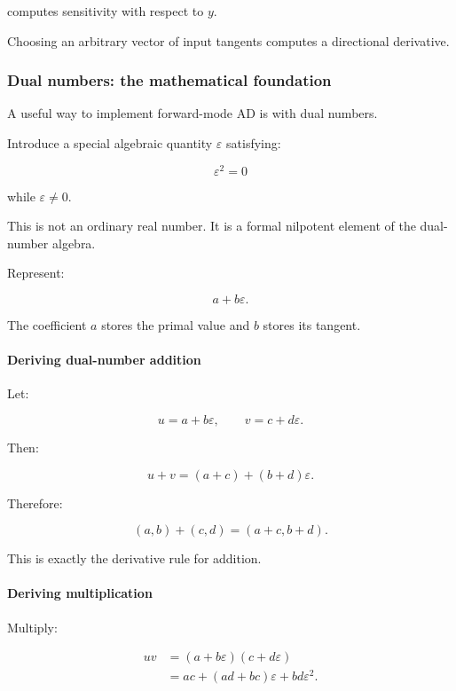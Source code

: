 computes sensitivity with respect to \(y\).

Choosing an arbitrary vector of input tangents computes a directional derivative.

\subsubsection{Dual numbers: the mathematical foundation}\label{02-foundations-ii-ch022-dual-numbers-the-mathematical-foundation}

A useful way to implement forward-mode AD is with dual numbers.

Introduce a special algebraic quantity \(\varepsilon\) satisfying:

\[
\boxed{\varepsilon^2=0}
\]

while \(\varepsilon\ne0\).

This is not an ordinary real number. It is a formal nilpotent element of the dual-number algebra.

Represent:

\[
a+b\varepsilon.
\]

The coefficient \(a\) stores the primal value and \(b\) stores its tangent.

\paragraph{Deriving dual-number addition}\label{02-foundations-ii-ch022-deriving-dual-number-addition}

Let:

\[
u=a+b\varepsilon, \qquad v=c+d\varepsilon.
\]

Then:

\[
u+v=(a+c)+(b+d)\varepsilon.
\]

Therefore:

\[
\boxed{ (a,b)+(c,d)=(a+c,b+d) }.
\]

This is exactly the derivative rule for addition.

\paragraph{Deriving multiplication}\label{02-foundations-ii-ch022-deriving-multiplication}

Multiply:

\[
\begin{aligned} uv &=(a+b\varepsilon)(c+d\varepsilon)\\ &=ac+(ad+bc)\varepsilon+bd\varepsilon^2. \end{aligned}
\]

